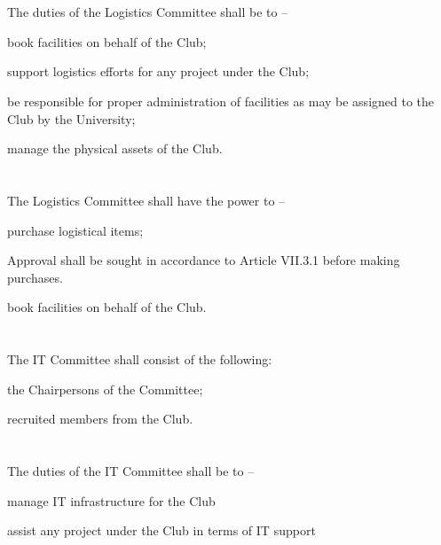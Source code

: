 \section{}
The duties of the Logistics Committee shall be to –
	\begin{legal}
	\item book facilities on behalf of the Club;
	\item support logistics efforts for any project under the Club;
	\item be responsible for proper administration of facilities as may be assigned to the Club by the University;
	\item manage the physical assets of the Club.
	\end{legal}

\section{}
The Logistics Committee shall have the power to –
	\begin{legal}
	\item purchase logistical items;
		\begin{legal}
		\item Approval shall be sought in accordance to Article VII.3.1 before making purchases.
		\end{legal}
	\item book facilities on behalf of the Club.
	\end{legal}

\section{}
The IT Committee shall consist of the following:
	\begin{legal}
	\item the Chairpersons of the Committee;
	\item recruited members from the Club.
	\end{legal}

\section{}
The duties of the IT Committee shall be to –
	\begin{legal}
	\item manage IT infrastructure for the Club
	\item assist any project under the Club in terms of IT support
	\end{legal}

